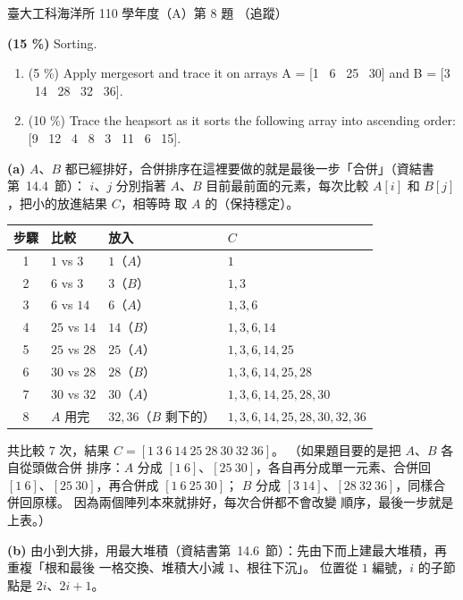 \begin{pastexam}[label={px:ntu-110-esoe-ds-08}]{臺大工科海洋所 110 學年度（A）第 8 題}
（追蹤）

\textbf{(15 \%)} Sorting.
\begin{enumerate}[label=(\alph*)]
\item (5 \%) Apply mergesort and trace it on arrays A = [1 \ 6 \ 25 \ 30] and B = [3 \ 14 \ 28 \ 32 \ 36].
\item (10 \%) Trace the heapsort as it sorts the following array into ascending order:\\
{[9 \ 12 \ 4 \ 8 \ 3 \ 11 \ 6 \ 15]}.
\end{enumerate}
\end{pastexam}

\begin{pastsoln}
\textbf{(a)} $A$、$B$ 都已經排好，合併排序在這裡要做的就是最後一步「合併」（資結書第~14.4~節）：
$i$、$j$ 分別指著 $A$、$B$ 目前最前面的元素，每次比較 $A[i]$ 和 $B[j]$，把小的放進結果 $C$，相等時
取 $A$ 的（保持穩定）。
\begin{center}
\begin{tabular}{clll}
\toprule
步驟 & 比較 & 放入 & $C$ \\
\midrule
1 & $1$ vs $3$ & $1$（$A$） & $1$ \\
2 & $6$ vs $3$ & $3$（$B$） & $1, 3$ \\
3 & $6$ vs $14$ & $6$（$A$） & $1, 3, 6$ \\
4 & $25$ vs $14$ & $14$（$B$） & $1, 3, 6, 14$ \\
5 & $25$ vs $28$ & $25$（$A$） & $1, 3, 6, 14, 25$ \\
6 & $30$ vs $28$ & $28$（$B$） & $1, 3, 6, 14, 25, 28$ \\
7 & $30$ vs $32$ & $30$（$A$） & $1, 3, 6, 14, 25, 28, 30$ \\
8 & $A$ 用完 & $32, 36$（$B$ 剩下的） & $1, 3, 6, 14, 25, 28, 30, 32, 36$ \\
\bottomrule
\end{tabular}
\end{center}
共比較 $7$ 次，結果 $C = [1\ 3\ 6\ 14\ 25\ 28\ 30\ 32\ 36]$。 （如果題目要的是把 $A$、$B$ 各自從頭做合併
排序：$A$ 分成 $[1\ 6]$、$[25\ 30]$，各自再分成單一元素、合併回 $[1\ 6]$、$[25\ 30]$，再合併成 $[1\ 6\ 25\ 30]$；
$B$ 分成 $[3\ 14]$、$[28\ 32\ 36]$，同樣合併回原樣。 因為兩個陣列本來就排好，每次合併都不會改變
順序，最後一步就是上表。）

\textbf{(b)} 由小到大排，用最大堆積（資結書第~14.6~節）：先由下而上建最大堆積，再重複「根和最後
一格交換、堆積大小減 $1$、根往下沉」。 位置從 $1$ 編號，$i$ 的子節點是 $2i$、$2i + 1$。


\end{pastsoln}
